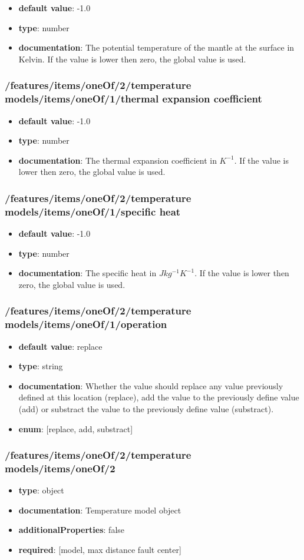 \begin{itemize}\item {\bf default value}: -1.0
\item {\bf type}: number
\item {\bf documentation}: The potential temperature of the mantle at the surface in Kelvin. If the value is lower then zero, the global value is used.
\end{itemize}\subsubsection{/features/items/oneOf/2/temperature models/items/oneOf/1/thermal expansion coefficient}
\begin{itemize}\item {\bf default value}: -1.0
\item {\bf type}: number
\item {\bf documentation}: The thermal expansion coefficient in $K^{-1}$. If the value is lower then zero, the global value is used.
\end{itemize}\subsubsection{/features/items/oneOf/2/temperature models/items/oneOf/1/specific heat}
\begin{itemize}\item {\bf default value}: -1.0
\item {\bf type}: number
\item {\bf documentation}: The specific heat in $J kg^{-1} K^{-1}$. If the value is lower then zero, the global value is used.
\end{itemize}\subsubsection{/features/items/oneOf/2/temperature models/items/oneOf/1/operation}
\begin{itemize}\item {\bf default value}: replace
\item {\bf type}: string
\item {\bf documentation}: Whether the value should replace any value previously defined at this location (replace), add the value to the previously define value (add) or substract the value to the previously define value (substract).
\item {\bf enum}: [replace, add, substract]\end{itemize}\subsubsection{/features/items/oneOf/2/temperature models/items/oneOf/2}
\begin{itemize}\item {\bf type}: object
\item {\bf documentation}: Temperature model object
\item {\bf additionalProperties}: false
\item {\bf required}: [model, max distance fault center]\end{itemize}
